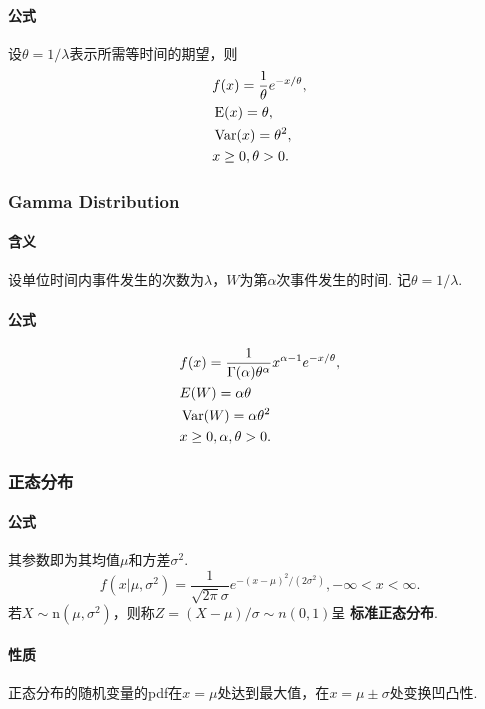     \paragraph{公式}
    设$\theta=1/\lambda$表示所需等时间的期望，则
    \begin{align*}
      & f(x) = \frac{1}{\theta}e^{-x/\theta}, \\
      & \operatorname{E}(x) = \theta, \\
      & \operatorname{Var}(x) = \theta^2, \\
      & x\ge 0, \theta>0.
    \end{align*}
      
  \subsubsection{Gamma Distribution}
    \paragraph{含义}
    设单位时间内事件发生的次数为$\lambda$，$W$为第$\alpha$次事件发生的时间. 记$\theta=1/
    \lambda$. 
    
    \paragraph{公式}
    \begin{align*}
      &f(x) = \frac{1}{\Gamma(\alpha)\theta^\alpha} x^{\alpha-1}e^{-x/\theta},\\
      &E(W) = \alpha\theta \\
      &\operatorname{Var}(W) = \alpha\theta^2 \\
      &x \ge 0, \alpha,\theta>0.
    \end{align*}
    

  \subsubsection{正态分布}
    \paragraph{公式}
    其参数即为其均值$\mu$和方差$\sigma^2$.
    \[
      f(x|\mu,\sigma^2)=\frac{1}{\sqrt{2\pi}\sigma}e^{-(x-\mu)^2/(2\sigma^2)},
      -\infty<x<\infty.
    \]
    若$X\sim\text{n}(\mu,\sigma^2)$，则称$Z=(X-\mu)/\sigma\sim n(0,1)$呈
    \textbf{标准正态分布}. 
    \paragraph{性质}
    正态分布的随机变量的pdf在$x=\mu$处达到最大值，在$x=\mu\pm\sigma$处变换凹凸性.
